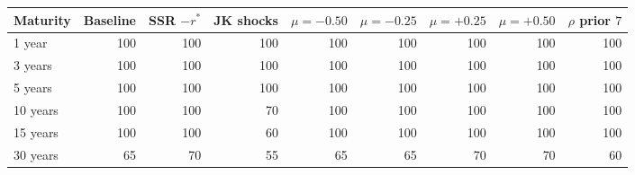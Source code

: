 %
%
%
%
\begin{tabular}{lrrrrrrrr}
\hline\hline
Maturity & Baseline & SSR $-r^\ast$ & JK shocks & $\mu=-0.50$ & $\mu=-0.25$ & $\mu=+0.25$ & $\mu=+0.50$ & $\rho$ prior $7$ \\
\hline
1 year & 100 & 100 & 100 & 100 & 100 & 100 & 100 & 100 \\
3 years & 100 & 100 & 100 & 100 & 100 & 100 & 100 & 100 \\
5 years & 100 & 100 & 100 & 100 & 100 & 100 & 100 & 100 \\
10 years & 100 & 100 & 70 & 100 & 100 & 100 & 100 & 100 \\
15 years & 100 & 100 & 60 & 100 & 100 & 100 & 100 & 100 \\
30 years & 65 & 70 & 55 & 65 & 65 & 70 & 70 & 60 \\
\hline\hline
\end{tabular}
